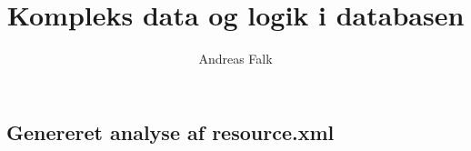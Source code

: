 \documentclass[a4paper,twoside,10pt]{report}
\begin{document}

\title{Kompleks data og logik i databasen}
\author{Andreas Falk}
\maketitle



\tableofcontents %
\cleardoublepage %
\pagestyle{fancy} %


 












\clearpage \thispagestyle{empty}
\begin{appendix}
\chapter{Genereret analyse af resource.xml}
\label{app:Genereret analyse af resource.xml}

\end{appendix}
\end{document}
